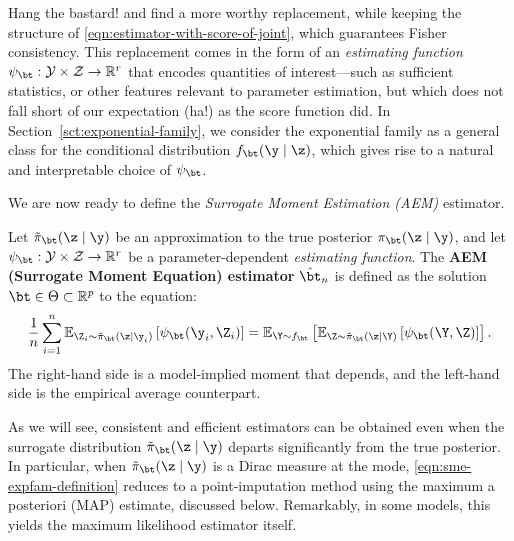 Hang the bastard! and find a more worthy replacement, while keeping the structure of \eqref{eqn:estimator-with-score-of-joint}, which guarantees Fisher consistency. This replacement comes in the form of an \textit{estimating function} $\psi_\bt : \mathcal{Y} \times \mathcal{Z} \to \mathbb{R}^r$ that encodes quantities of interest—such as sufficient statistics, or other features relevant to parameter estimation, but which does not fall short of our expectation (ha!) as the score function did. In Section~\ref{sct:exponential-family}, we consider the exponential family as a general class for the conditional distribution $f_\bt(\y \mid \z)$, which gives rise to a natural and interpretable choice of $\psi_\bt$.

We are now ready to define the \emph{Surrogate Moment Estimation (AEM)} estimator.
%

\begin{tcolorbox}[colback=blue!3!white,colframe=blue!70!black,title=AEM General Definition]
\begin{definition}
Let \( \tilde\pi_\bt(\z \mid \y) \) be an approximation to the true posterior \( \pi_\bt(\z \mid \y) \), and let \( \psi_\bt : \mathcal{Y} \times \mathcal{Z} \to \mathbb{R}^r \) be a parameter-dependent \emph{estimating function}. The \textbf{AEM (Surrogate Moment Equation) estimator} \( \hat\bt_n \) is defined as the solution \( \bt \in \Theta \subset \mathbb{R}^p \) to the equation:
\begin{equation}
\label{eqn:general-sme}
\frac{1}{n} \sum_{i=1}^n 
\mathbb{E}_{\Z_i \sim \tilde\pi_\bt(\z \mid \y_i)} 
\left[
\psi_\bt(\y_i, \Z_i)
\right]
=
\mathbb{E}_{\Y \sim f_\bt}
\left[
\mathbb{E}_{\Z \sim \tilde\pi_\bt(\z \mid \Y)} 
\left[
\psi_\bt(\Y, \Z)
\right]
\right].
\end{equation}
The right-hand side is a model-implied moment that depends, and the left-hand side is the empirical average counterpart.
\end{definition}
\end{tcolorbox}
As we will see, consistent and efficient estimators can be obtained even when the surrogate distribution \( \tilde\pi_\bt(\z \mid \y) \) departs significantly from the true posterior. In particular, when \( \tilde\pi_\bt(\z \mid \y) \) is a Dirac measure at the mode, \eqref{eqn:sme-expfam-definition} reduces to a point-imputation method using the maximum a posteriori (MAP) estimate, discussed below. Remarkably, in some models, this yields the maximum likelihood estimator itself.


